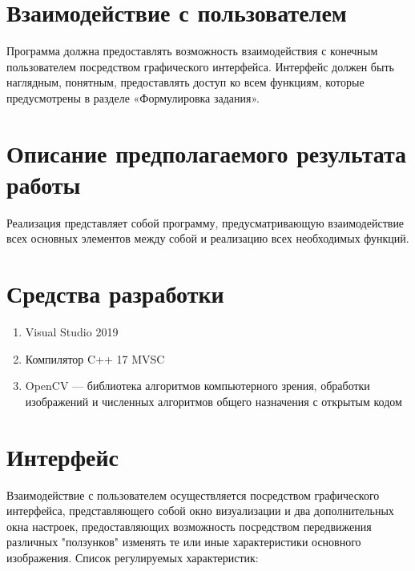 \documentclass[a4paper,12pt,preview]{report} %
\begin{document}
	\section{Взаимодействие с пользователем}
	
	Программа должна предоставлять возможность взаимодействия с конечным пользователем посредством графического интерфейса. Интерфейс должен быть наглядным, понятным, предоставлять доступ ко всем функциям, которые предусмотрены в разделе «Формулировка задания».
	
	\section{Описание предполагаемого результата работы}
	
	Реализация представляет собой программу, предусматривающую взаимодействие всех основных элементов между собой и реализацию всех необходимых функций.
	
	\section{Средства разработки}
	
	\begin{enumerate}
		\item Visual Studio 2019 
		
		\item Компилятор C++ 17 MVSC
		
		\item OpenCV — библиотека алгоритмов компьютерного зрения, обработки изображений и численных алгоритмов общего назначения с открытым кодом
		
	\end{enumerate}
	
	\section{Интерфейс}
	
	Взаимодействие с пользователем осуществляется посредством графического интерфейса, представляющего собой окно визуализации и два дополнительных окна настроек, предоставляющих возможность посредством передвижения различных "ползунков" изменять те или иные характеристики основного изображения. Список регулируемых характеристик:
	
\end{document}
